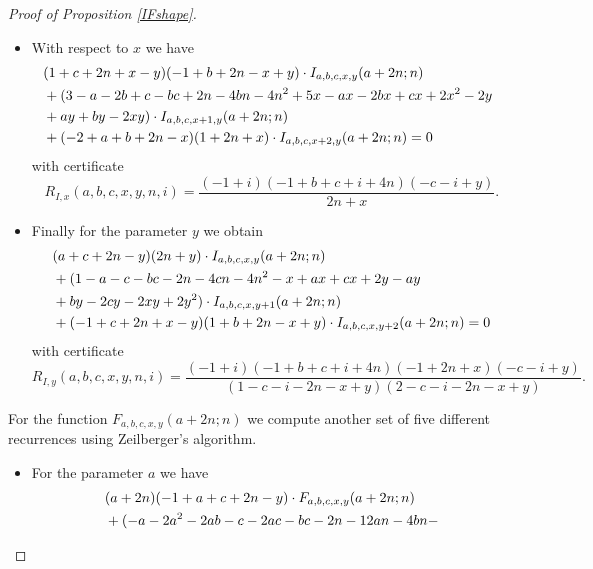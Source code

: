 \documentclass{amsart}
\numberwithin{equation}{section}
\begin{document}
\begin{proof}[Proof of Proposition \ref{IFshape}]
\begin{itemize}
\begin{align}
            &+ c^2 x + 2 a n x + 2 b n x + 6 c n x + 12 n^2 x + 2 b y - a c y + 
            2 b c y + 4 n y - 2 a n y + 2 b n y \notag\\
            &+ 2 c n y + b x y + 2 n x y - 
            b y^2 - 2 n y^2)\big)\notag.
        \end{align}
        \item With respect to $x$ we have
        \begin{align}
            &(1 + c + 2 n + x - y) (-1 + b + 2 n - x + y)\cdot I_{a,b,c,x,y}(a+2n;n)\hphantom{a}\\
            &+(3 - a - 2 b + c - b c + 2 n - 4 b n - 4 n^2 + 5 x - a x - 2 b x + 
  c x + 2 x^2 - 2 y  \hphantom{a}\notag\\
            &+a y + b y - 2 x y)\cdot I_{a,b,c,x+1,y}(a+2n;n)\hphantom{a}\notag\\
            &+(-2 + a + b + 2 n - x) (1 + 2 n + x)\cdot I_{a,b,c,x+2,y}(a+2n;n)=0\notag
        \end{align}
        with certificate
        \[R_{I,x}(a,b,c,x,y,n,i)=\frac{(-1 + i) (-1 + b + c + i + 4 n) (-c - i + y)}{2 n + x}.\]
        \item Finally for the parameter $y$ we obtain
        \begin{align}
            &(a + c + 2 n - y)  (2 n + y)\cdot I_{a,b,c,x,y}(a+2n;n)\hphantom{a}\\
            &+(1 - a - c - b c - 2 n - 4 c n - 4 n^2 - x + a x + c x + 2 y - a y  \hphantom{a}\notag\\
            &+b y - 2 c y - 2 x y + 2 y^2)\cdot I_{a,b,c,x,y+1}(a+2n;n)\hphantom{a}\notag\\
            &+(-1 + c + 2 n + x - y) (1 + b + 2 n - x + y)\cdot I_{a,b,c,x,y+2}(a+2n;n)=0\notag
        \end{align}
        with certificate
        \[R_{I,y}(a,b,c,x,y,n,i)=\frac{(-1 + i) (-1 + b + c + i + 4 n) (-1 + 2 n + x) (-c - i + y)}{(1 - c - i - 2 n - x + y) (2 - c - i - 2 n - x + y)}.\]
    \end{itemize}
    For the function $F_{a,b,c,x,y}(a+2n;n)$ we compute another set of five different recurrences using Zeilberger's algorithm.
    \begin{itemize}
        \item For the parameter $a$ we have
        \begin{align}
            &(a + 2 n) (-1 + a + c + 2 n - y)\cdot F_{a,b,c,x,y}(a+2n;n)\hphantom{a}\\
            &+(-a - 2 a^2 - 2 a b - c - 2 a c - b c - 2 n - 12 a n - 4 b n - 

\end{align}
\end{itemize}
\end{proof}
\end{document}
